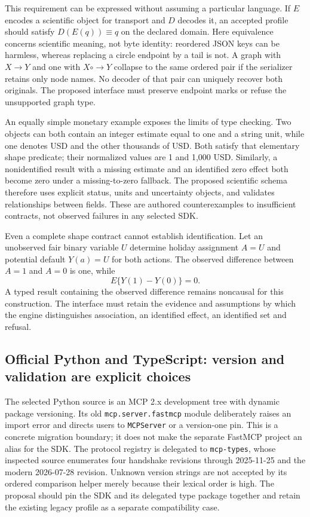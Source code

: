 This requirement can be expressed without assuming a particular language.
If $E$ encodes a scientific object for transport and $D$ decodes it, an accepted
profile should satisfy $D(E(q))\equiv q$ on the declared domain. Here
equivalence concerns scientific meaning, not byte identity: reordered JSON
keys can be harmless, whereas replacing a circle endpoint by a tail is not.
A graph with $X\to Y$ and one with $X\mathbin{\circ\!\!\to}Y$ collapse to
the same ordered pair if the serializer retains only node names. No decoder
of that pair can uniquely recover both originals. The proposed interface must
preserve endpoint marks or refuse the unsupported graph type.
\citep{exec24_mcp_contracts}

An equally simple monetary example exposes the limits of type checking.
Two objects can both contain an integer estimate equal to one and a string
unit, while one denotes USD and the other thousands of USD. Both satisfy that
elementary shape predicate; their normalized values are 1 and 1,000 USD.
Similarly, a nonidentified result with a missing estimate and an identified
zero effect both become zero under a missing-to-zero fallback. The proposed
scientific schema therefore uses explicit status, units and uncertainty
objects, and validates relationships between fields. These are authored
counterexamples to insufficient contracts, not observed failures in any
selected SDK.\citep{exec24_mcp_contracts}

Even a complete shape contract cannot establish identification. Let an
unobserved fair binary variable $U$ determine holiday assignment $A=U$ and
potential default $Y(a)=U$ for both actions. The observed difference between
$A=1$ and $A=0$ is one, while
\[
 E\{Y(1)-Y(0)\}=0.
\]
A typed result containing the observed difference remains noncausal for this
construction. The interface must retain the evidence and assumptions by which
the engine distinguishes association, an identified effect, an identified
set and refusal.\citep{exec24_mcp_contracts}

\subsection{Official Python and TypeScript: version and validation are explicit choices}

The selected Python source is an MCP 2.x development tree with dynamic package
versioning. Its old \texttt{mcp.server.fastmcp} module deliberately raises an
import error and directs users to \texttt{MCPServer} or a version-one pin. This
is a concrete migration boundary; it does not make the separate FastMCP
project an alias for the SDK. The protocol registry is delegated to
\texttt{mcp-types}, whose inspected source enumerates four handshake revisions
through 2025-11-25 and the modern 2026-07-28 revision. Unknown version strings
are not accepted by its ordered comparison helper merely because their
lexical order is high. The proposal should pin the SDK and its delegated type
package together and retain the existing legacy profile as a separate
compatibility case.\citep{exec24_mcp_python}

